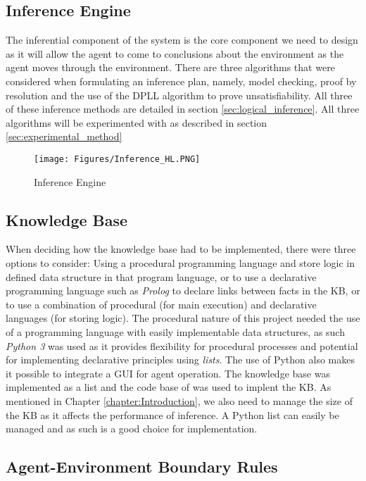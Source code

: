 \subsection{Inference Engine}
The inferential component of the system is the core component we need to design as it will allow the agent to come to conclusions about the environment as the agent moves through the environment. There are three algorithms that were considered when formulating an inference plan, namely, model checking, proof by resolution and the use of the DPLL algorithm to prove unsatisfiability. All three of these inference methods are detailed in section \ref{sec:logical_inference}. All three algorithms will be experimented with as described in section \ref{sec:experimental_method}

\begin{figure}[H]
    \centering
    \texttt{[image: Figures/Inference\_HL.PNG]}
    \caption{Inference Engine} 
    \label{fig:inference_engine}
\end{figure}

\subsection{Knowledge Base}

When deciding how the knowledge base had to be implemented, there were three options to consider: Using a procedural programming language and store logic in defined data structure in that program language, or to use a declarative programming language such as \textit{Prolog} to declare links between facts in the KB, or to use a combination of procedural (for main execution) and declarative languages (for storing logic). The procedural nature of this project needed the use of a programming language with easily implementable data structures, as such \textit{Python 3} was used as it provides flexibility for procedural processes and potential for implementing declarative principles using \textit{lists}. The use of Python also makes it possible to integrate a GUI for agent operation. The knowledge  base was implemented as a list and the code base of \citep{russell2016artificial} was used to implent the KB. As mentioned in Chapter \ref{chapter:Introduction}, we also need to manage the size of the KB as it affects the performance of inference. A Python list can easily be managed and as such is a good choice for implementation.

\subsection{Agent-Environment Boundary Rules}

